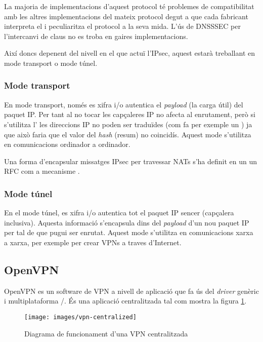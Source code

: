 La majoria de implementacions d'aquest protocol té problemes de compatibilitat amb les altres implementacions del mateix protocol degut a que cada fabricant interpreta el  i peculiaritza el protocol a la seva mida. L'ús de DNSSSEC per l'intercanvi de claus no es troba en gaires implementacions.

Així doncs depenent del nivell en el que actuï l'IPsec, aquest estarà treballant en mode transport o mode túnel.
\subsubsection{Mode transport}
En mode transport, només es xifra i/o autentica el \emph{payload} (la carga útil) del paquet IP. Per tant al no tocar les capçaleres IP no afecta al enrutament, però si s'utilitza l' les direccions IP no poden ser traduïdes (com fa per exemple un ) ja que això faria que el valor del \emph{hash} (resum) no coincidís. Aquest mode s'utilitza en comunicacions ordinador a ordinador.

Una forma d'encapsular missatges IPsec per travessar NATs s'ha definit en un un RFC com a mecanisme .
\subsubsection{Mode túnel}
En el mode túnel, es xifra i/o autentica tot el paquet IP sencer (capçalera inclusiva). Aquesta informació s'encapsula dins del \emph{payload} d'un nou paquet IP per tal de que pugui ser enrutat. Aquest mode s'utilitza en comunicacions xarxa a xarxa, per exemple per crear VPNs a traves d'Internet.

\subsection{OpenVPN}
OpenVPN es un software de VPN a nivell de aplicació que fa ús del \emph{driver} genèric i multiplataforma /. És una aplicació centralitzada tal com mostra la figura \ref{F:vpn-centralized}.

\begin{figure}[htb]
\centering
\texttt{[image: images/vpn-centralized]}
\caption{Diagrama de funcionament d'una VPN centralitzada}
\label{F:vpn-centralized}
\end{figure}

